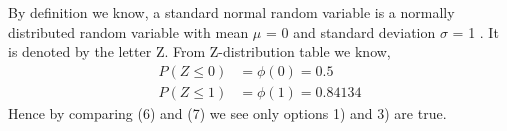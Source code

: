 \documentclass[journal,12pt,twocolumn]{IEEEtran}
\begin{document}
By definition we know, a standard normal random variable is a normally distributed random variable with mean $\mu$ = 0  and standard deviation $\sigma$ = 1 . It is denoted by the letter  Z. From Z-distribution table we know,
\begin{equation}\tag{7}
    \begin{split}
        P(Z\leqslant 0) &= \phi(0) = 0.5\\
        P(Z\leqslant 1) &= \phi(1) = 0.84134
    \end{split}
\end{equation}
Hence by comparing (6) and (7) we see only options 1) and 3) are true. 
\end{document}

